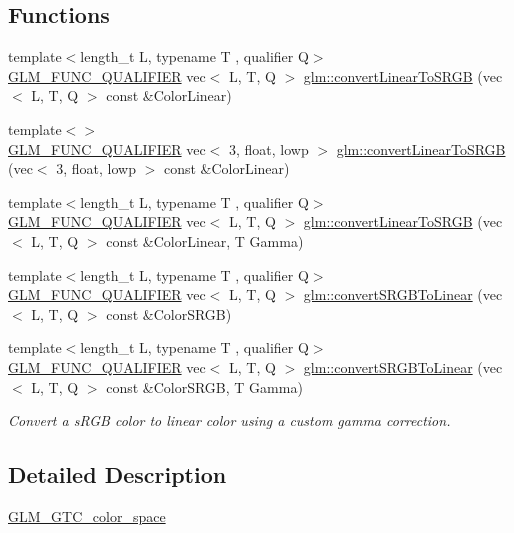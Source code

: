 \subsection*{Functions}
\begin{DoxyCompactItemize}
\item 
{\footnotesize template$<$length\+\_\+t L, typename T , qualifier Q$>$ }\\\mbox{\hyperlink{setup_8hpp_a33fdea6f91c5f834105f7415e2a64407}{G\+L\+M\+\_\+\+F\+U\+N\+C\+\_\+\+Q\+U\+A\+L\+I\+F\+I\+ER}} vec$<$ L, T, Q $>$ \mbox{\hyperlink{group__gtc__color__space_ga42239e7b3da900f7ef37cec7e2476579}{glm\+::convert\+Linear\+To\+S\+R\+GB}} (vec$<$ L, T, Q $>$ const \&Color\+Linear)
\item 
{\footnotesize template$<$$>$ }\\\mbox{\hyperlink{setup_8hpp_a33fdea6f91c5f834105f7415e2a64407}{G\+L\+M\+\_\+\+F\+U\+N\+C\+\_\+\+Q\+U\+A\+L\+I\+F\+I\+ER}} vec$<$ 3, float, lowp $>$ \mbox{\hyperlink{namespaceglm_a45c5c68bea13598b1794da72b79dbb08}{glm\+::convert\+Linear\+To\+S\+R\+GB}} (vec$<$ 3, float, lowp $>$ const \&Color\+Linear)
\item 
{\footnotesize template$<$length\+\_\+t L, typename T , qualifier Q$>$ }\\\mbox{\hyperlink{setup_8hpp_a33fdea6f91c5f834105f7415e2a64407}{G\+L\+M\+\_\+\+F\+U\+N\+C\+\_\+\+Q\+U\+A\+L\+I\+F\+I\+ER}} vec$<$ L, T, Q $>$ \mbox{\hyperlink{group__gtc__color__space_gaace0a21167d13d26116c283009af57f6}{glm\+::convert\+Linear\+To\+S\+R\+GB}} (vec$<$ L, T, Q $>$ const \&Color\+Linear, T Gamma)
\item 
{\footnotesize template$<$length\+\_\+t L, typename T , qualifier Q$>$ }\\\mbox{\hyperlink{setup_8hpp_a33fdea6f91c5f834105f7415e2a64407}{G\+L\+M\+\_\+\+F\+U\+N\+C\+\_\+\+Q\+U\+A\+L\+I\+F\+I\+ER}} vec$<$ L, T, Q $>$ \mbox{\hyperlink{group__gtc__color__space_ga16c798b7a226b2c3079dedc55083d187}{glm\+::convert\+S\+R\+G\+B\+To\+Linear}} (vec$<$ L, T, Q $>$ const \&Color\+S\+R\+GB)
\item 
{\footnotesize template$<$length\+\_\+t L, typename T , qualifier Q$>$ }\\\mbox{\hyperlink{setup_8hpp_a33fdea6f91c5f834105f7415e2a64407}{G\+L\+M\+\_\+\+F\+U\+N\+C\+\_\+\+Q\+U\+A\+L\+I\+F\+I\+ER}} vec$<$ L, T, Q $>$ \mbox{\hyperlink{group__gtc__color__space_gad1b91f27a9726c9cb403f9fee6e2e200}{glm\+::convert\+S\+R\+G\+B\+To\+Linear}} (vec$<$ L, T, Q $>$ const \&Color\+S\+R\+GB, T Gamma)
\begin{DoxyCompactList}\small\item\em Convert a s\+R\+GB color to linear color using a custom gamma correction. \end{DoxyCompactList}\end{DoxyCompactItemize}


\subsection{Detailed Description}
\mbox{\hyperlink{group__gtc__color__space}{G\+L\+M\+\_\+\+G\+T\+C\+\_\+color\+\_\+space}} 
